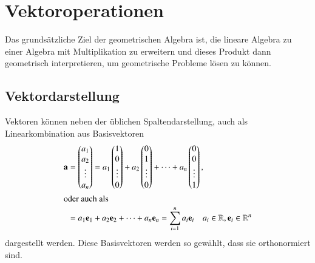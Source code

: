 \section{Vektoroperationen\label{clifford:section:Vektoroperationen}}
Das grundsätzliche Ziel der geometrischen Algebra ist, die lineare Algebra zu einer Algebra mit Multiplikation zu erweitern und dieses Produkt dann geometrisch interpretieren, um  geometrische Probleme lösen zu können.
 \subsection{Vektordarstellung\label{clifford:section:Vektordarstellung}}
Vektoren können neben der üblichen Spaltendarstellung, auch als Linearkombination aus Basisvektoren
\begin{align*}
    \textbf{a} 
    &=
    \begin{pmatrix} 
    a_1 \\ a_2 \\ \vdots \\ a_n   
    \end{pmatrix} 
    =
    a_1 \begin{pmatrix}
    1 \\ 0 \\ \vdots \\ 0  
    \end{pmatrix} 
    + 
    a_2\begin{pmatrix} 
    0 \\ 1 \\ \vdots \\ 0  
    \end{pmatrix} + \dots 
    + 
    a_n\begin{pmatrix}
    0 \\ 0 \\ \vdots \\ 1  
    \end{pmatrix},\\
\intertext{oder auch als}
    &= 
    a_1\textbf{e}_1 
    +
    a_2\textbf{e}_2
    + 
    \dots + a_n\textbf{e}_n
    = 
    \sum_{i=1}^{n} a_i \textbf{e}_i
    \quad
    a_i \in \mathbb{R}
    , \textbf{e}_i \in \mathbb{R}^n
\end{align*}
dargestellt werden.
Diese Basisvektoren werden so gewählt, dass sie orthonormiert sind. 
